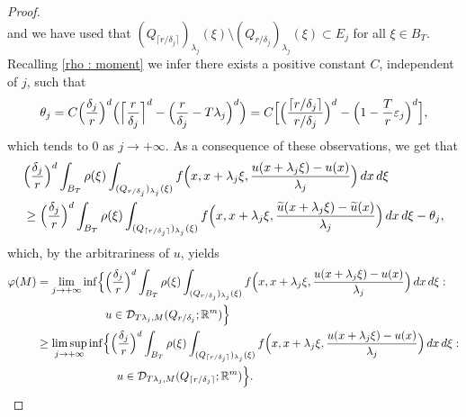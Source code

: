 \documentclass[10pt,a4paper]{amsart}
\newcommand{\R}{\mathbb{R}}
\newcommand{\dej}{\delta_j}
\newcommand{\ej}{\varepsilon_j}
\newcommand{\f}{\varphi}
\begin{document}
\begin{proof}
\begin{equation}
\end{equation}
and we have used that $(Q_{\lceil r/\dej \rceil })_{\lambda_j}(\xi) \setminus (Q_{r/\dej})_{\lambda_j}(\xi)\subset E_j$ for all $\xi\in B_T$. Recalling \eqref{rho : moment} we infer there exists a positive constant $C$, independent of $j$, such that
\begin{equation*}
 \theta_j  = C \Bigl(\frac{\dej}{r}\Bigr)^d \Bigl( \Bigl\lceil \frac{r}{\dej} \Bigr\rceil^d - \Bigl(\frac{r}{\dej}-T\lambda_j\Bigr)^d \Bigr)  = C\Bigl[\Bigl( \frac{\lceil {r/\dej} \rceil}{r/\dej}\Bigr)^d - \Bigl(1-\frac{T}{r}\ej\Bigr)^d \Bigr],
\end{equation*}
which tends to $0$ as $j\to+\infty$. As a consequence of these observations, we get that
\begin{align*}
     &\Bigl(\frac{\dej}{r}\Bigr)^d\int_{B_T} \rho(\xi)\int_{(Q_{r/\dej})_{\lambda_j}(\xi)} f\Bigl(x,x+\lambda_j\xi,\frac{u(x+\lambda_j\xi)-u(x)}{\lambda_j}\Bigr)\, dx\,d\xi \\
     & \geq \Bigl(\frac{\dej}{r}\Bigr)^d\int_{B_T} \rho(\xi)\int_{(Q_{\lceil r/\dej \rceil })_{\lambda_j}(\xi)} f\Bigl(x,x+\lambda_j\xi,\frac{\widetilde{u}(x+\lambda_j\xi)-\widetilde{u}(x)}{\lambda_j}\Bigr)\, dx\,d\xi -\theta_j,    
\end{align*}
which, by the arbitrariness of $u$, yields
\begin{align*}
    \f(M) & = \lim_{j\to+\infty} \inf\Bigl\{ \Bigl(\frac{\dej}{r}\Bigr)^d\int_{B_T} \rho(\xi)\int_{(Q_{r/\dej})_{\lambda_j}(\xi)} f\Bigl(x,x+\lambda_j\xi,\frac{u(x+\lambda_j\xi)-u(x)}{\lambda_j}\Bigr)\, dx\,d\xi : \\
    & \qquad \qquad \qquad  u\in \mathcal{D}_{T\lambda_j,M}(Q_{r/\dej}; \R^m) \Bigr\} \\
    & \geq \limsup_{j\to+\infty} \inf\Bigl\{\Bigl(\frac{\dej}{r}\Bigr)^d\int_{B_T} \rho(\xi)\int_{(Q_{\lceil r/\dej\rceil})_{\lambda_j}(\xi)} f\Bigl(x,x+\lambda_j\xi,\frac{u(x+\lambda_j\xi)-u(x)}{\lambda_j}\Bigr)\, dx\,d\xi : \\
    & \qquad \qquad \qquad \quad u\in \mathcal{D}_{T\lambda_j,M}(Q_{\lceil r/\dej\rceil}; \R^m) \Bigr\}.
\end{align*}


\end{proof}
\end{document}
